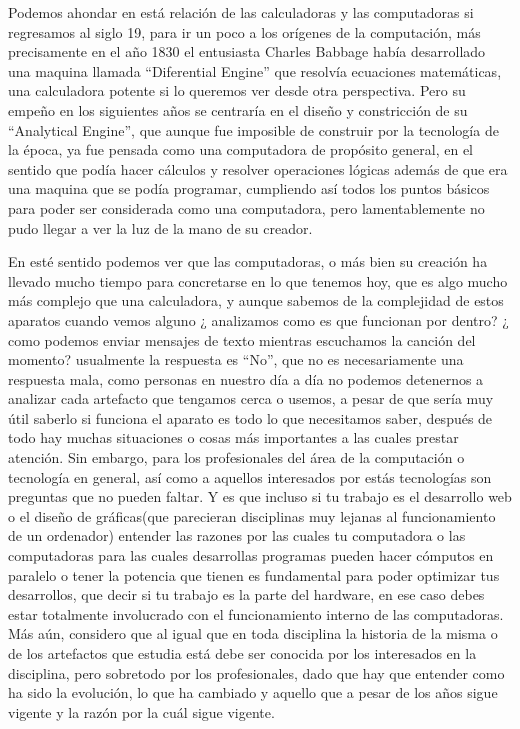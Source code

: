 \documentclass[letterpaper,12pt,oneside]{book}
\begin{document}
	
	Podemos ahondar en está relación de las calculadoras y las computadoras si regresamos al siglo 19, para ir un poco a los orígenes de la computación,
    más precisamente en el año 1830 el entusiasta Charles Babbage había desarrollado una maquina llamada ``Diferential Engine''
	que resolvía ecuaciones matemáticas, una calculadora potente si lo queremos ver desde otra perspectiva. Pero su empeño en los siguientes años 
	se centraría en el diseño y constricción
	de su ``Analytical Engine'', que aunque fue imposible de construir por la tecnología de la época, ya fue pensada como una computadora
	de propósito general, en el sentido que podía hacer cálculos y resolver operaciones lógicas además de que era una maquina que se podía programar,
	cumpliendo así todos los puntos básicos para poder ser considerada como una computadora, pero lamentablemente no pudo llegar a ver la luz de la mano
	de su creador.
	
	En esté sentido podemos ver que las computadoras, o más bien su creación ha llevado mucho tiempo para concretarse en lo que tenemos hoy, que es algo mucho
	más complejo que una calculadora, y aunque sabemos de la complejidad de estos aparatos cuando vemos alguno ¿ analizamos como es que funcionan por dentro? ¿ como podemos enviar mensajes de texto mientras escuchamos la canción del momento?
	usualmente la respuesta es ``No'', que no es necesariamente una respuesta mala, como personas en nuestro día a día no podemos detenernos a analizar cada artefacto que tengamos cerca o usemos, a pesar de que sería muy útil saberlo
	si funciona el aparato es todo lo que necesitamos saber, después de todo hay muchas situaciones o cosas más importantes
	a las cuales prestar atención. Sin embargo, para los profesionales del área de la computación o tecnología en general, así como a aquellos interesados
	por estás tecnologías son preguntas que no pueden faltar. Y es que incluso si tu trabajo es el desarrollo web o
	el diseño de gráficas(que parecieran disciplinas muy lejanas al funcionamiento de un ordenador) entender las razones por las cuales tu computadora o las computadoras para las cuales desarrollas programas pueden hacer cómputos
	en paralelo o tener la potencia que tienen es fundamental para poder optimizar tus desarrollos, que decir si tu trabajo es la parte del hardware, en ese
	caso debes estar totalmente involucrado con el funcionamiento interno de las computadoras.
	Más aún, considero que al igual que en toda disciplina la historia de la misma o de los artefactos que estudia está debe ser conocida por
	los interesados en la disciplina, pero sobretodo por los profesionales, dado que hay que entender como ha sido la evolución, lo que ha cambiado
	y aquello que a pesar de los años sigue vigente y la razón por la cuál sigue vigente.
	
\end{document}
